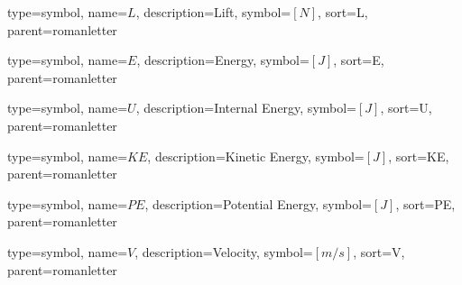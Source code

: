 {
type=symbol, %
name={\ensuremath{L}}, %
description={Lift}, %
symbol={$\left[N\right]$}, %
sort=L, %
parent=romanletter %
}

{
type=symbol, %
name={\ensuremath{E}}, %
description={Energy}, %
symbol={$\left[J\right]$}, %
sort=E, %
parent=romanletter %
}

{
type=symbol, %
name={\ensuremath{U}}, %
description={Internal Energy}, %
symbol={$\left[J\right]$}, %
sort=U, %
parent=romanletter %
}

{
type=symbol, %
name={\ensuremath{KE}}, %
description={Kinetic Energy}, %
symbol={$\left[J\right]$}, %
sort=KE, %
parent=romanletter %
}

{
type=symbol, %
name={\ensuremath{PE}}, %
description={Potential Energy}, %
symbol={$\left[J\right]$}, %
sort=PE, %
parent=romanletter %
}

{
type=symbol, %
name={\ensuremath{V}}, %
description={Velocity}, %
symbol={$\left[m/s\right]$}, %
sort=V, %
parent=romanletter %
}

